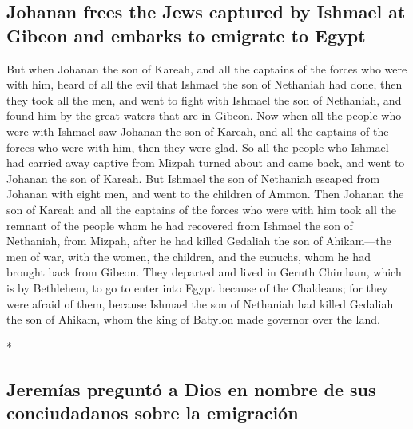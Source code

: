\begin{paracol}{2}
\begin{otherlanguage}{english}
\hypertarget{johanan-frees-the-jews-captured-by-ishmael-at-gibeon-and-embarks-to-emigrate-to-egypt}{%
\subsection{Johanan frees the Jews captured by Ishmael at Gibeon and
embarks to emigrate to
Egypt}\label{johanan-frees-the-jews-captured-by-ishmael-at-gibeon-and-embarks-to-emigrate-to-egypt}}

 But when Johanan the son of Kareah, and all the captains
of the forces who were with him, heard of all the evil that Ishmael the
son of Nethaniah had done,  then they took all the men,
and went to fight with Ishmael the son of Nethaniah, and found him by
the great waters that are in Gibeon.  Now when all the
people who were with Ishmael saw Johanan the son of Kareah, and all the
captains of the forces who were with him, then they were glad.
 So all the people who Ishmael had carried away captive
from Mizpah turned about and came back, and went to Johanan the son of
Kareah.  But Ishmael the son of Nethaniah escaped from
Johanan with eight men, and went to the children of Ammon.
 Then Johanan the son of Kareah and all the captains of
the forces who were with him took all the remnant of the people whom he
had recovered from Ishmael the son of Nethaniah, from Mizpah, after he
had killed Gedaliah the son of Ahikam---the men of war, with the women,
the children, and the eunuchs, whom he had brought back from Gibeon.
 They departed and lived in Geruth Chimham, which is by
Bethlehem, to go to enter into Egypt  because of the
Chaldeans; for they were afraid of them, because Ishmael the son of
Nethaniah had killed Gedaliah the son of Ahikam, whom the king of
Babylon made governor over the land.

\end{otherlanguage}

\switchcolumn[0]*

\hypertarget{jeremuxedas-preguntuxf3-a-dios-en-nombre-de-sus-conciudadanos-sobre-la-emigraciuxf3n}{%
\subsection{Jeremías preguntó a Dios en nombre de sus conciudadanos
sobre la
emigración}\label{jeremuxedas-preguntuxf3-a-dios-en-nombre-de-sus-conciudadanos-sobre-la-emigraciuxf3n}}


\end{paracol}
